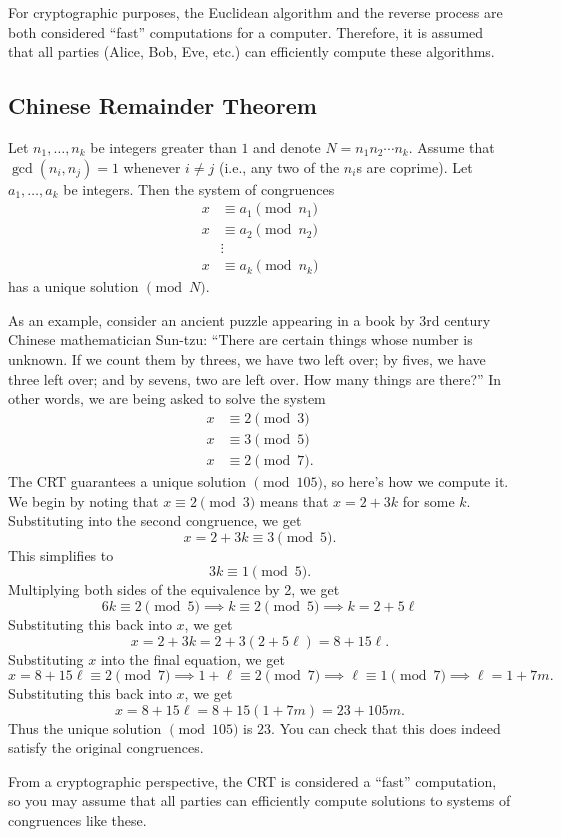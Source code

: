 \documentclass{article}
\begin{document}
        For cryptographic purposes, the Euclidean algorithm and the reverse process are both considered ``fast'' computations for a computer.
        Therefore, it is assumed that all parties (Alice, Bob, Eve, etc.) can efficiently compute these algorithms.

    \subsection{Chinese Remainder Theorem}

        \begin{theorem}[CRT]
            Let \(n_1,\ldots,n_k\) be integers greater than \(1\) and denote \(N=n_1n_2\cdots n_k\).
            Assume that \(\gcd(n_i,n_j)=1\) whenever \(i\neq j\) (i.e., any two of the \(n_i\)s are coprime).
            Let \(a_1,\ldots,a_k\) be integers.
            Then the system of congruences
            \begin{align*}
                x &\equiv a_1\pmod{n_1}\\
                x &\equiv a_2\pmod{n_2}\\
                &\vdots\\
                x &\equiv a_k\pmod{n_k}
            \end{align*}
            has a unique solution \(\pmod{N}\).
        \end{theorem}

        As an example, consider an ancient puzzle appearing in a book by 3rd century Chinese mathematician Sun-tzu:
        ``There are certain things whose number is unknown. 
        If we count them by threes, we have two left over; by fives, we have three left over; and by sevens, two are left over. 
        How many things are there?''
        In other words, we are being asked to solve the system
        \begin{align*}
            x &\equiv 2\pmod{3}\\
            x &\equiv 3\pmod{5}\\
            x &\equiv 2\pmod{7}.
        \end{align*}
        The CRT guarantees a unique solution \(\pmod{105}\), so here's how we compute it.
        We begin by noting that \(x\equiv 2\pmod 3\) means that \(x=2+3k\) for some \(k\).
        Substituting into the second congruence, we get 
        \[x=2+3k\equiv 3\pmod 5.\]
        This simplifies to
        \[3k\equiv 1\pmod 5.\]
        Multiplying both sides of the equivalence by 2, we get
        \[6k\equiv 2\pmod 5\implies k\equiv 2\pmod 5\implies k=2 + 5\ell\]
        Substituting this back into \(x\), we get 
        \[x = 2 + 3k = 2 + 3(2+5\ell) = 8 + 15\ell.\]
        Substituting \(x\) into the final equation, we get
        \[x = 8+15\ell\equiv 2\pmod 7\implies 1+\ell\equiv 2\pmod 7\implies \ell\equiv 1\pmod 7\implies \ell = 1+7m.\]
        Substituting this back into \(x\), we get
        \[x = 8 + 15\ell = 8 + 15(1+7m) = 23 + 105m.\]
        Thus the unique solution \(\pmod{105}\) is \(23\). 
        You can check that this does indeed satisfy the original congruences.

        From a cryptographic perspective, the CRT is considered a ``fast'' computation, so you may assume that all parties can efficiently compute solutions to systems of congruences like these.
\end{document}
